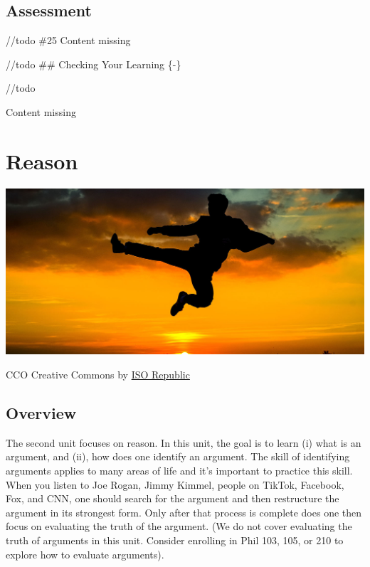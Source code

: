 \documentclass[
]{book}
\begin{document}
\hypertarget{assessment}{%
\section*{Assessment}\label{assessment}}

//todo \#25
{Content missing}

//todo
\#\# Checking Your Learning \{-\}

//todo

{Content missing}

\hypertarget{reason}{%
\chapter{Reason}\label{reason}}

\includegraphics{assets/u2/Unit2Overview.jpg}

CCO Creative Commons by \href{https://isorepublic.com/photo/flying-kick/}{ISO Republic}

\hypertarget{overview-1}{%
\section*{Overview}\label{overview-1}}

The second unit focuses on reason. In this unit, the goal is to learn (i) what is an argument, and (ii), how does one identify an argument. The skill of identifying arguments applies to many areas of life and it's important to practice this skill. When you listen to Joe Rogan, Jimmy Kimmel, people on TikTok, Facebook, Fox, and CNN, one should search for the argument and then restructure the argument in its strongest form. Only after that process is complete does one then focus on evaluating the truth of the argument. (We do not cover evaluating the truth of arguments in this unit. Consider enrolling in Phil 103, 105, or 210 to explore how to evaluate arguments).
\end{document}
